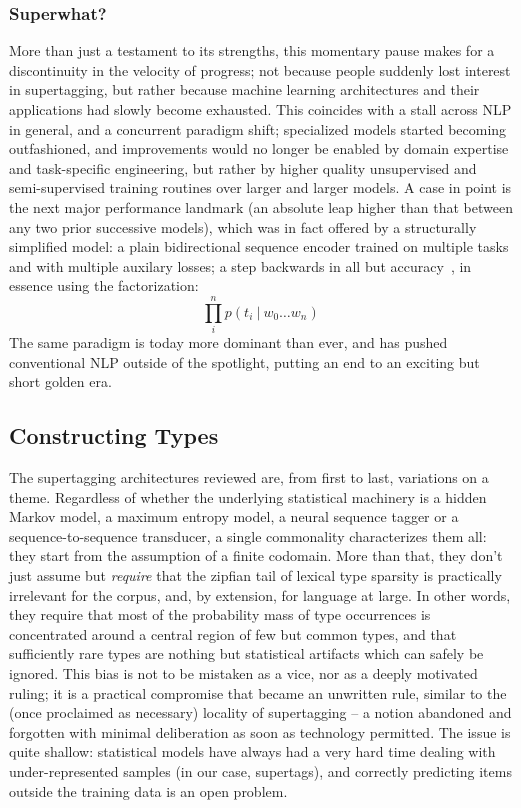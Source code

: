 \subsubsection{Superwhat?}
More than just a testament to its strengths, this momentary pause makes for a discontinuity in the velocity of progress; not because people suddenly lost interest in supertagging, but rather because machine learning architectures and their applications had slowly become exhausted.
This coincides with a stall across NLP in general, and a concurrent paradigm shift; specialized models started becoming outfashioned, and improvements would no longer be enabled by domain expertise and task-specific engineering, but rather by higher quality unsupervised and semi-supervised training routines over larger and larger models.
A case in point is the next major performance landmark (an absolute leap higher than that between any two prior successive models), which was in fact offered by a structurally simplified model: a plain bidirectional sequence encoder trained on multiple tasks and with multiple auxilary losses; a step backwards in all but accuracy~\cite{clark-etal-2018-semi}, in essence using the factorization:
\begin{equation}
	\prod_i^n p(t_i \ | \ w_0 \dots w_n)
\end{equation}
The same paradigm is today more dominant than ever, and has pushed conventional NLP outside of the spotlight, putting an end to an exciting but short golden era.

\subsection{Constructing Types}
The supertagging architectures reviewed are, from first to last, variations on a theme.
Regardless of whether the underlying statistical machinery is a hidden Markov model, a maximum entropy model, a neural sequence tagger or a sequence-to-sequence transducer, a single commonality characterizes them all: they start from the assumption of a finite codomain.
More than that, they don't just assume but \textit{require} that the zipfian tail of lexical type sparsity is practically irrelevant for the corpus, and, by extension, for language at large.
In other words, they require that most of the probability mass of type occurrences is concentrated around a central region of few but common types, and that sufficiently rare types are nothing but statistical artifacts which can safely be ignored.
This bias is not to be mistaken as a vice, nor as a deeply motivated ruling; it is a practical compromise that became an unwritten rule, similar to the (once proclaimed as necessary) locality of supertagging -- a notion abandoned and forgotten with minimal deliberation as soon as technology permitted.
The issue is quite shallow: statistical models have always had a very hard time dealing with under-represented samples (in our case, supertags), and correctly predicting items outside the training data is an open problem.

